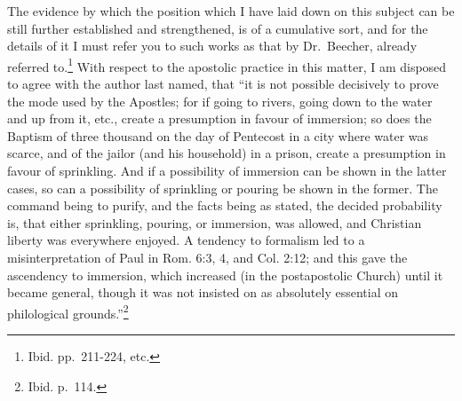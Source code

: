 \documentclass[]{book}
\begin{document}
The evidence by which the position which I have laid down on this subject can be still further established and strengthened, is of a cumulative sort, and for the details of it I must refer you to such works as that by Dr.~Beecher, already referred to.\footnote{Ibid. pp.~211-224, etc.} With respect to the apostolic practice in this matter, I am disposed to agree with the author last named, that ``it is not possible decisively to prove the mode used by the Apostles; for if going to rivers, going down to the water and up from it, etc., create a presumption in favour of immersion; so does the Baptism of three thousand on the day of Pentecost in a city where water was scarce, and of the jailor (and his household) in a prison, create a presumption in favour of sprinkling. And if a possibility of immersion can be shown in the latter cases, so can a possibility of sprinkling or pouring be shown in the former. The command being to purify, and the facts being as stated, the decided probability is, that either sprinkling, pouring, or immersion, was allowed, and Christian liberty was everywhere enjoyed. A tendency to formalism led to a misinterpretation of Paul in Rom. 6:3, 4, and Col. 2:12; and this gave the ascendency to immersion, which increased (in the postapostolic Church) until it became general, though it was not insisted on as absolutely essential on philological grounds.''\footnote{Ibid. p.~114.}
\end{document}
